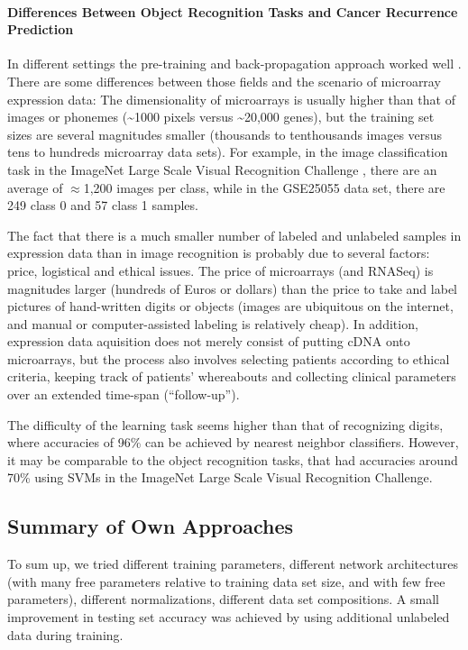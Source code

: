 \paragraph{Differences Between Object Recognition Tasks and Cancer Recurrence
Prediction}

In different settings the pre-training and back-propagation approach
worked well \cite{ErhanBengio2010}. There are some differences between
those fields and the scenario of microarray expression data: The dimensionality
of microarrays is usually higher than that of images or phonemes (\textasciitilde{}1000
pixels versus \textasciitilde{}20,000 genes), but the training set
sizes are several magnitudes smaller (thousands to tenthousands images
versus tens to hundreds microarray data sets). For example, in the
image classification task in the ImageNet Large Scale Visual Recognition
Challenge \cite{RussakovskyFeiFei2015}, there are an average of $\approx$1,200
images per class, while in the GSE25055 data set, there are 249 class
0 and 57 class 1 samples.

The fact that there is a much smaller number of labeled and unlabeled
samples in expression data than in image recognition is probably due
to several factors: price, logistical and ethical issues. The price
of microarrays (and RNASeq) is magnitudes larger (hundreds of Euros
or dollars) than the price to take and label pictures of hand-written
digits or objects (images are ubiquitous on the internet, and manual
or computer-assisted labeling is relatively cheap). In addition, expression
data aquisition does not merely consist of putting cDNA onto microarrays,
but the process also involves selecting patients according to ethical
criteria, keeping track of patients' whereabouts and collecting clinical
parameters over an extended time-span (``follow-up'').

The difficulty of the learning task seems higher than that of recognizing
digits, where accuracies of 96\% can be achieved by nearest neighbor
classifiers. However, it may be comparable to the object recognition
tasks, that had accuracies around 70\% using SVMs in the ImageNet
Large Scale Visual Recognition Challenge.

\subsection{Summary of Own Approaches}

To sum up, we tried different training parameters, different network
architectures (with many free parameters relative to training data
set size, and with few free parameters), different normalizations,
different data set compositions. A small improvement in testing set
accuracy was achieved by using additional unlabeled data during training.

